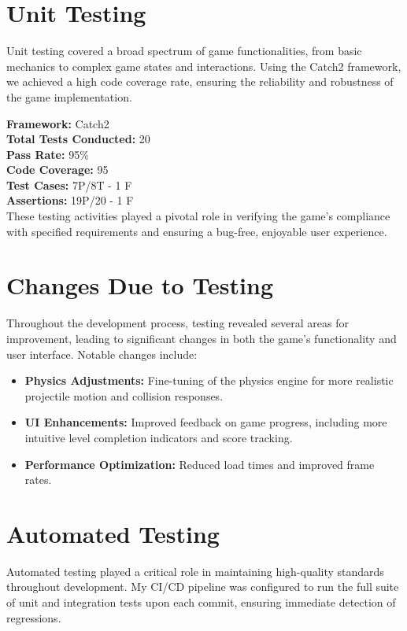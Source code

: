 \documentclass[12pt]{article}
\begin{document}
\FloatBarrier
\section{Unit Testing}
Unit testing covered a broad spectrum of game functionalities, from basic mechanics to complex game states and interactions. Using the Catch2 framework, we achieved a high code coverage rate, ensuring the reliability and robustness of the game implementation.

\textbf{Framework:} Catch2 \\
\textbf{Total Tests Conducted:} 20 \\
\textbf{Pass Rate:} 95\% \\
\textbf{Code Coverage:} 95\\
\textbf{Test Cases:} 7P/8T - 1 F \\
\textbf{Assertions:} 19P/20 - 1 F \\

These testing activities played a pivotal role in verifying the game's compliance with specified requirements and ensuring a bug-free, enjoyable user experience.

\FloatBarrier
\section{Changes Due to Testing}
Throughout the development process, testing revealed several areas for improvement, leading to significant changes in both the game's functionality and user interface. Notable changes include:

\begin{itemize}
    \item \textbf{Physics Adjustments:} Fine-tuning of the physics engine for more realistic projectile motion and collision responses.
    \item \textbf{UI Enhancements:} Improved feedback on game progress, including more intuitive level completion indicators and score tracking.
    \item \textbf{Performance Optimization:} Reduced load times and improved frame rates.
\end{itemize}

\FloatBarrier
\section{Automated Testing}
Automated testing played a critical role in maintaining high-quality standards throughout development. My CI/CD pipeline was configured to run the full suite of unit and integration tests upon each commit, ensuring immediate detection of regressions.
\end{document}
